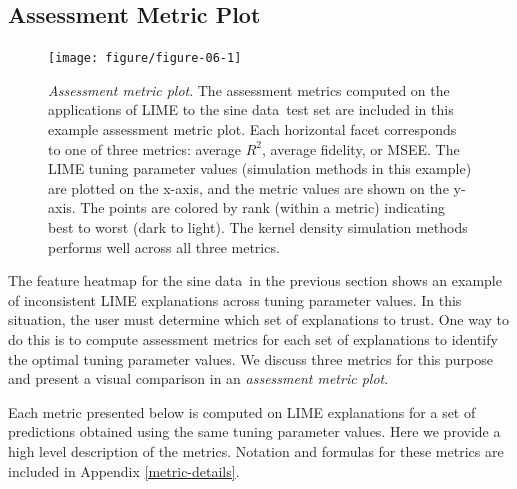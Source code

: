 \documentclass[AMS,STIX2COL]{WileyNJD-v2}\usepackage[]{graphicx}\usepackage[]{color}
\newenvironment{knitrout}{}{} %
\newcommand{\data}{sine data}
\begin{document}
\subsection{Assessment Metric Plot} \label{assess-metric}

\begin{figure}[!thp]
\begin{knitrout}
\color{fgcolor}

{\centering \texttt{[image: figure/figure-06-1]} 

}



\end{knitrout}
\caption{\emph{Assessment metric plot}. The assessment metrics computed on the applications of LIME to the \data \ test set are included in this example assessment metric plot. Each horizontal facet corresponds to one of three metrics: average $R^2$, average fidelity, or MSEE. The LIME tuning parameter values (simulation methods in this example) are plotted on the x-axis, and the metric values are shown on the y-axis. The points are colored by rank (within a metric) indicating best to worst (dark to light). The kernel density simulation methods performs well across all three metrics.}
\label{fig:figure-06}
\end{figure}

The feature heatmap for the \data \ in the previous section shows an example of inconsistent LIME explanations across tuning parameter values. In this situation, the user must determine which set of explanations to trust. One way to do this is to compute assessment metrics for each set of explanations to identify the optimal tuning parameter values. We discuss three metrics for this purpose and present a visual comparison in an \emph{assessment metric plot}.

Each metric presented below is computed on  LIME explanations for a set of predictions obtained using the same tuning parameter values. Here we provide a high level description of the metrics. Notation and formulas for these metrics are included in Appendix \ref{metric-details}.
\end{document}
